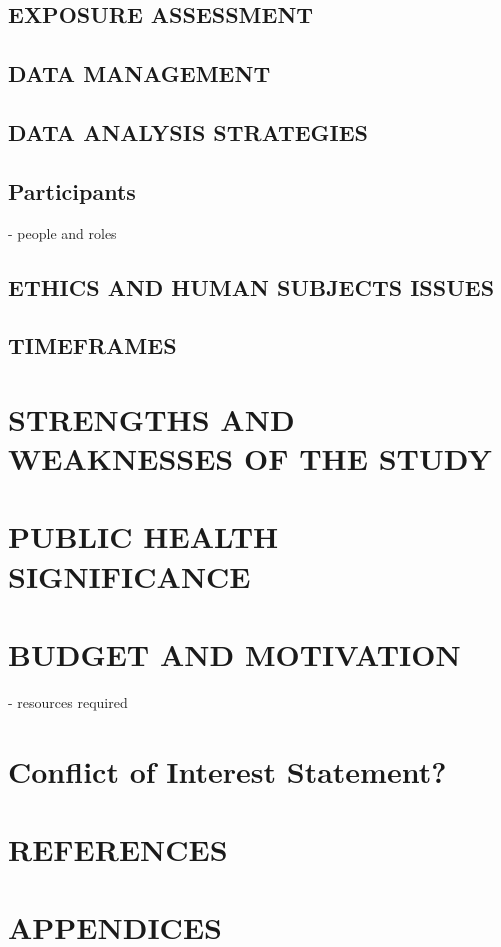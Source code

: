 \documentclass[a4paper, amsfonts, amssymb, amsmath, reprint, showkeys, nofootinbib, twoside]{revtex4-1}
\begin{document}
\subsection{EXPOSURE ASSESSMENT}
\subsection{DATA MANAGEMENT}
\subsection{DATA ANALYSIS STRATEGIES}

\subsection{Participants}
- people and roles

\subsection{ETHICS AND HUMAN SUBJECTS ISSUES}
\subsection{TIMEFRAMES}

\section{STRENGTHS AND WEAKNESSES OF THE STUDY}
\section{PUBLIC HEALTH SIGNIFICANCE}
\section{BUDGET AND MOTIVATION}
- resources required

\section{Conflict of Interest Statement?}

\section{REFERENCES}
\section{APPENDICES}
\end{document}

